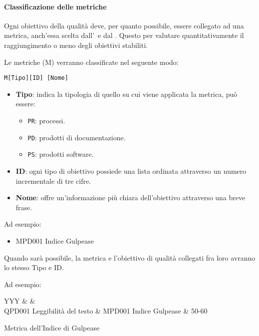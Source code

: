			\paragraph{Classificazione delle metriche}\label{Classificazione metriche}
			Ogni obiettivo della qualità deve, per quanto possibile, essere collegato ad una metrica, anch'essa scelta dall'\Amm\ e dal \Ver. Questo per valutare
			quantitativamente il raggiungimento o meno degli obiettivi stabiliti.

			Le metriche (M) verranno classificate nel seguente modo:

			\begin{center}
				\texttt{M[Tipo][ID] [Nome]}
			\end{center}

			\begin{itemize}
				\item \textbf{Tipo}: indica la tipologia di quello su cui viene applicata la metrica, può essere:
				\begin{itemize}
					\item \texttt{PR}: processi.
					\item \texttt{PD}: prodotti di documentazione.
					\item \texttt{PS}: prodotti software.
				\end{itemize}

				\item \textbf{ID}: ogni tipo di obiettivo possiede una lista ordinata attraverso un numero incrementale di tre cifre.
				\item \textbf{Nome}: offre un'informazione più chiara dell'obiettivo attraverso una breve frase.
			\end{itemize}

			Ad esempio:

			\begin{itemize}
				\item MPD001 Indice Gulpease
			\end{itemize}

			Quando sarà possibile, la metrica e l'obiettivo di qualità collegati fra loro avranno lo stesso Tipo e ID.

			Ad esempio:

			\begin{table}[H]
				\begin{detailtable}{\textwidth}{YYY}
					 &
					 &
					\\\toprule
					QPD001 Leggibilità del testo & MPD001 Indice Gulpease & 50-60\\
				\end{detailtable}
				\caption[Metrica Indice di Gulpease]{Metrica dell'Indice di Gulpease}%
			\end{table}


